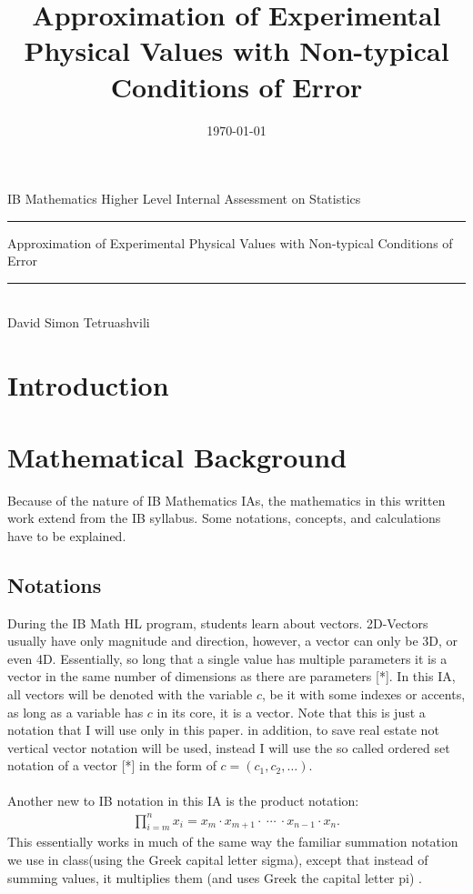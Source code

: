 \documentclass[11pt,a4paper]{article}
\title{Approximation of Experimental Physical Values with Non-typical Conditions of Error}
\date{\today}
\numberwithin{equation}{subsection}
\begin{document}
\begin{titlepage}
\begin{center}
IB Mathematics Higher Level Internal Assessment on Statistics 
\\ 
\rule{\textwidth}{0.25pt}
\linebreak
\Huge{Approximation of Experimental Physical Values with Non-typical Conditions of Error}
\rule{\textwidth}{0.25pt} \\
[15cm]
\large {David Simon Tetruashvili} \\

\end{center}
\end{titlepage}
\newpage

\tableofcontents
{}
\newpage

\section{Introduction}

\section{Mathematical Background}
Because of the nature of IB Mathematics IAs, the mathematics in this written work extend from the IB syllabus. Some notations, concepts, and calculations have to be explained. 

\subsection{Notations}
During the IB Math HL program, students learn about vectors. 2D-Vectors usually have only magnitude and direction, however, a vector can only be 3D, or even 4D. Essentially, so long that a single value has multiple parameters it is a vector in the same number of dimensions as there are parameters [*]. In this IA, all vectors will be denoted with the variable $c$, be it with some indexes or accents, as long as a variable has $c$ in its core, it is a vector. Note that this is just a notation that I will use only in this paper. in addition, to save real estate not vertical vector notation will be used, instead I will use the so called ordered set notation of a vector [*] in the form of $c=(c_{1},c_{2},\dots)$.  \\
\\
Another new to IB notation in this IA is the product notation:
\begin{gather*}
\prod\limits_{i = m}^{n} x_{i} = x_{m} \cdot x_{m+1} \cdot \  \cdots \  \cdot x_{n-1} \cdot x_{n}.
\end{gather*}
This essentially works in much of the same way the familiar summation notation we use in class(using the Greek capital letter sigma), except that instead of summing values, it multiplies them (and uses Greek the capital letter pi) \cite{product}.
\end{document}
